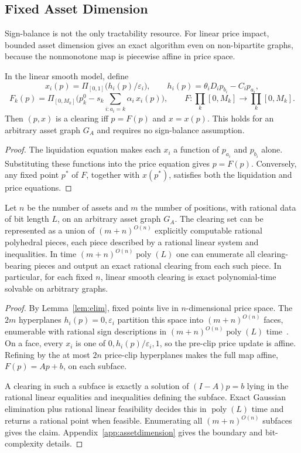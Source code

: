 \documentclass{llncs}
\newcommand{\clip}{\Pi}
\newcommand{\GA}{G_A}
\newcommand{\eps}{\varepsilon}
\newcommand{\poly}{\operatorname{poly}}
\begin{document}
\subsection{Fixed Asset Dimension}
\label{sec:assetdimension}

Sign-balance is not the only tractability resource.  For linear price impact, bounded asset dimension gives an exact algorithm even on non-bipartite graphs, because the nonmonotone map is piecewise affine in price space.

\begin{lemma}
\label{lem:elim}
In the linear smooth model, define
\[
   x_i(p)=\clip_{[0,1]}\!\big(h_i(p)/\eps_i\big),\qquad
   h_i(p)=\theta_iD_i p_{b_i}-C_i p_{a_i},
\]
\[
   F_k(p)=\clip_{[0,M_k]}\!\Big(p_k^0-s_k\!\!\sum_{i:a_i=k}\!\!\alpha_i\,x_i(p)\Big),
   \qquad F:\prod_k[0,M_k]\to\prod_k[0,M_k].
\]
Then \((p,x)\) is a clearing iff \(p=F(p)\) and \(x=x(p)\). This holds for an arbitrary asset graph \(\GA\) and requires no sign-balance assumption.
\end{lemma}
\begin{proof}
The liquidation equation makes each \(x_i\) a function of \(p_{a_i}\) and \(p_{b_i}\) alone. Substituting these functions into the price equation gives \(p=F(p)\). Conversely, any fixed point \(p^\ast\) of \(F\), together with \(x(p^\ast)\), satisfies both the liquidation and price equations.
\end{proof}

\begin{theorem}
\label{thm:arrangement}
Let \(n\) be the number of assets and \(m\) the number of positions, with rational data of bit length \(L\), on an arbitrary asset graph \(\GA\). The clearing set can be represented as a union of \((m+n)^{O(n)}\) explicitly computable rational polyhedral pieces, each piece described by a rational linear system and inequalities. In time \((m+n)^{O(n)}\poly(L)\) one can enumerate all clearing-bearing pieces and output an exact rational clearing from each such piece. In particular, for each fixed \(n\), linear smooth clearing is exact polynomial-time solvable on arbitrary graphs.
\end{theorem}
\begin{proof}
By Lemma~\ref{lem:elim}, fixed points live in \(n\)-dimensional price space. The \(2m\) hyperplanes \(h_i(p)=0,\eps_i\) partition this space into \((m+n)^{O(n)}\) faces, enumerable with rational sign descriptions in \((m+n)^{O(n)}\poly(L)\) time~\cite{EdelsbrunnerORourkeSeidel1986}. On a face, every \(x_i\) is one of \(0,h_i(p)/\eps_i,1\), so the pre-clip price update is affine. Refining by the at most \(2n\) price-clip hyperplanes makes the full map affine, \(F(p)=Ap+b\), on each subface.

A clearing in such a subface is exactly a solution of \((I-A)p=b\) lying in the rational linear equalities and inequalities defining the subface. Exact Gaussian elimination plus rational linear feasibility decides this in \(\poly(L)\) time and returns a rational point when feasible. Enumerating all \((m+n)^{O(n)}\) subfaces gives the claim. Appendix~\ref{app:assetdimension} gives the boundary and bit-complexity details.
\end{proof}
\end{document}
